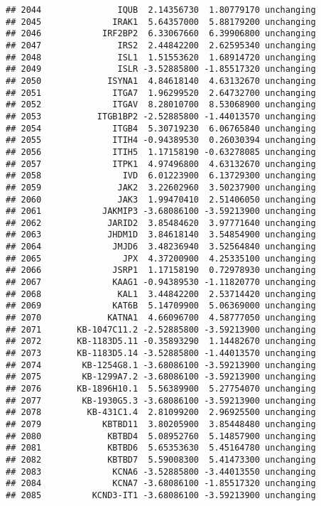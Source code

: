 \documentclass[]{article}
\begin{document}
\begin{verbatim}
## 2044               IQUB  2.14356730  1.80779170 unchanging
## 2045              IRAK1  5.64357000  5.88179200 unchanging
## 2046            IRF2BP2  6.33067660  6.39906800 unchanging
## 2047               IRS2  2.44842200  2.62595340 unchanging
## 2048               ISL1  1.51553620  1.68914720 unchanging
## 2049               ISLR -3.52885800 -1.85517320 unchanging
## 2050             ISYNA1  4.84618140  4.63132670 unchanging
## 2051              ITGA7  1.96299520  2.64732700 unchanging
## 2052              ITGAV  8.28010700  8.53068900 unchanging
## 2053           ITGB1BP2 -2.52885800 -1.44013570 unchanging
## 2054              ITGB4  5.30719230  6.06765840 unchanging
## 2055              ITIH4 -0.94389530  0.26030394 unchanging
## 2056              ITIH5  1.17158190 -0.63278085 unchanging
## 2057              ITPK1  4.97496800  4.63132670 unchanging
## 2058                IVD  6.01223900  6.13729300 unchanging
## 2059               JAK2  3.22602960  3.50237900 unchanging
## 2060               JAK3  1.99470410  2.51406050 unchanging
## 2061            JAKMIP3 -3.68086100 -3.59213900 unchanging
## 2062             JARID2  3.85484620  3.97771640 unchanging
## 2063             JHDM1D  3.84618140  3.54854900 unchanging
## 2064              JMJD6  3.48236940  3.52564840 unchanging
## 2065                JPX  4.37200900  4.25335100 unchanging
## 2066              JSRP1  1.17158190  0.72978930 unchanging
## 2067              KAAG1 -0.94389530 -1.11820770 unchanging
## 2068               KAL1  3.44842200  2.53714420 unchanging
## 2069              KAT6B  5.14709900  5.06369000 unchanging
## 2070             KATNA1  4.66096700  4.58777050 unchanging
## 2071       KB-1047C11.2 -2.52885800 -3.59213900 unchanging
## 2072       KB-1183D5.11 -0.35893290  1.14482670 unchanging
## 2073       KB-1183D5.14 -3.52885800 -1.44013570 unchanging
## 2074        KB-1254G8.1 -3.68086100 -3.59213900 unchanging
## 2075        KB-1299A7.2 -3.68086100 -3.59213900 unchanging
## 2076       KB-1896H10.1  5.56389900  5.27754070 unchanging
## 2077        KB-1930G5.3 -3.68086100 -3.59213900 unchanging
## 2078         KB-431C1.4  2.81099200  2.96925500 unchanging
## 2079            KBTBD11  3.80205900  3.85448480 unchanging
## 2080             KBTBD4  5.08952760  5.14857900 unchanging
## 2081             KBTBD6  5.65353630  5.45164780 unchanging
## 2082             KBTBD7  5.59008300  5.41473300 unchanging
## 2083              KCNA6 -3.52885800 -3.44013550 unchanging
## 2084              KCNA7 -3.68086100 -1.85517320 unchanging
## 2085          KCND3-IT1 -3.68086100 -3.59213900 unchanging

\end{verbatim}
\end{document}
